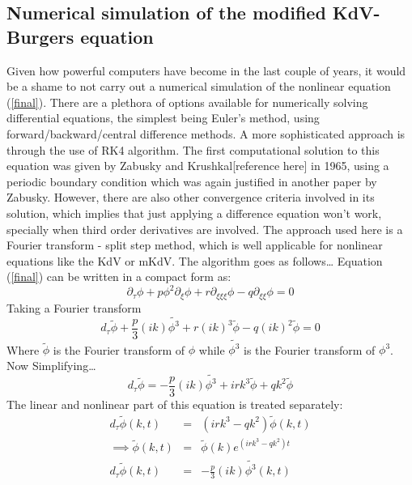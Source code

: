 \documentclass[a4paper, 12pt]{article}
\begin{document}
\subsection{Numerical simulation of the modified KdV-Burgers equation}
Given how powerful computers have become in the last couple of years, it would be a shame to not carry out a numerical simulation of the nonlinear equation (\ref{final}). There are a plethora of options available for numerically solving
differential equations, the simplest being Euler's method, using forward/backward/central difference methods. A more sophisticated approach is through the use of RK4 algorithm. The first computational solution to this equation was given by Zabusky and Krushkal[reference here] in 1965, using a periodic boundary condition which was again justified in another paper by Zabusky\cite{Zabusky1971}. However, there are also other convergence criteria involved in its solution,
which implies that just applying a difference equation won't work, specially when third order derivatives are involved. The approach used here is a Fourier transform - split step method\cite{muslu2003}, which is well applicable for nonlinear
equations like the KdV or mKdV. The algorithm goes as follows\dots
\newline
\newline
Equation (\ref{final}) can be written in a compact form as:
\begin{equation}\label{final-compact}
    \partial_\tau \phi + p \phi^2 \partial_\xi \phi + r \partial_{\xi\xi\xi} \phi - q\partial_{\xi\xi} \phi = 0
\end{equation}
Taking a Fourier transform
\begin{equation}
    d_\tau \tilde{\phi} + \frac{p}{3} (ik) \widetilde{\phi^3} + r {(ik)}^3 \tilde{\phi} - q {(ik)}^2 \tilde{\phi} = 0 \label{Fouriated}
\end{equation}
Where $\tilde{\phi}$ is the Fourier transform of $\phi$ while $\widetilde{\phi^3}$ is the Fourier transform of $\phi^3$.\\
Now Simplifying\dots
\begin{equation}
    d_\tau \tilde{\phi} = -\frac{p}{3}(ik)\widetilde{\phi^3} + i r k^3 \tilde{\phi} + q k^2\tilde{\phi} \label{mini-fouriated}
\end{equation}
The linear and nonlinear part of this equation is treated separately:
\begin{eqnarray}
    d_\tau \tilde{\phi}(k, t) &=& (irk^3 - qk^2)\tilde{\phi}(k,t) \label{fouriated-linear}\\
    \implies \tilde{\phi}(k,t) &=& \tilde{\phi}(k)e^{(irk^3 - qk^2)t} \label{fouriated-int}\\
    d_\tau \tilde{\phi}(k, t) &=& -\frac{p}{3}(ik) \widetilde{\phi^3}(k,t) \label{fouriated-nonlin}
\end{eqnarray}
\end{document}
